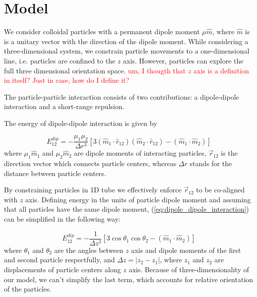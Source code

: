 \section{Model}
\label{sec:model}
We consider colloidal particles with a permanent dipole moment $\mu \hat{m}$, where $\hat{m}$ is is a unitary vector with the direction of the dipole moment. While considering a three-dimensional system, we constrain particle movements to a one-dimensional line, i.e. particles are confined to the $z$ axis. However, particles can explore the full three dimensional orientation space. \textcolor{red}{um, I thougth that $z$ axis is a definition in itself? Just in case, how do I define it?}

The particle-particle interaction consists of two contributions: a dipole-dipole interaction and a short-range repulsion.

The energy of dipole-dipole interaction is given by

\begin{equation}
\label{eq:dipole_dipole_interaction}
E^{dip}_{12} = - \frac{\mu_1 \mu_2}{\Delta r^3}[3 (\hat{m}_1 \cdot \hat{r}_{12})(\hat{m}_2 \cdot \hat{r}_{12}) - (\hat{m}_1 \cdot \hat{m}_2)]
\end{equation}
where $\mu_1 \hat{m}_1$ and $\mu_2 \hat{m}_2$ are dipole moments of interacting particles, $\vec{r}_{12}$ is the direction vector which connects particle centers, whereas $\Delta r$ stands for the distance between particle centers.

By constraining particles in 1D tube we effectively enforce $\vec{r}_{12}$ to be co-aligned with $z$ axis. Defining energy in the units of particle dipole moment and assuming that all particles have the same dipole moment, (\ref{eq:dipole_dipole_interaction}) can be simplified in the following way:

\begin{equation}
\label{eq_dipole_dipole_1D}
E_{12}^{dip} = - \frac{1}{\Delta z^3} [3 \cos \theta_1 \cos \theta_2 - (\hat{m}_1 \cdot \hat{m}_2)]
\end{equation}
where $\theta_1$ and $\theta_2$ are the angles between $z$ axis and dipole moments of the first and second particle respectfully, and $\Delta z = |z_2 - z_1|$, where $z_1$ and $z_2$ are displacements of particle centers along $z$ axis. Because of three-dimensionality of our model, we can't simplify the last term, which accounts for relative orientation of the particles.

